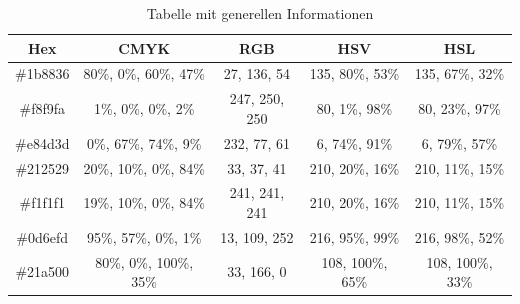 \begin{table}[h]
\begin{tabular}{|c|c|c|c|c|}
	\hline
	Hex & CMYK & RGB & HSV & HSL \\
	\hline
	\#1b8836 & 80\%, 0\%, 60\%, 47\% & 27, 136, 54 & 135, 80\%, 53\% & 135, 67\%, 32\%  \\
	\hline 
	\#f8f9fa & 1\%, 0\%, 0\%, 2\% & 247, 250, 250 & 80, 1\%, 98\% & 80, 23\%, 97\% \\
	\hline
	\#e84d3d & 0\%, 67\%, 74\%, 9\% & 232, 77, 61 & 6, 74\%, 91\% & 6, 79\%, 57\% \\
	\hline
	\#212529 & 20\%, 10\%, 0\%, 84\% & 33, 37, 41 & 210, 20\%, 16\% & 210, 11\%, 15\% \\
	\hline
	\#f1f1f1 & 19\%, 10\%, 0\%, 84\% & 241, 241, 241 & 210, 20\%, 16\% & 210, 11\%, 15\% \\
	\hline
	\#0d6efd & 95\%, 57\%, 0\%, 1\% & 13, 109, 252 & 216, 95\%, 99\% & 216, 98\%, 52\% \\
	\hline
	\#21a500 & 80\%, 0\%, 100\%, 35\% & 33, 166, 0 & 108, 100\%, 65\% & 108, 100\%, 33\% \\
	\hline

	
\end{tabular}
	\caption{Tabelle mit generellen Informationen}
\label{tab:Tabelle mit generellen Informationen}
\end{table}
